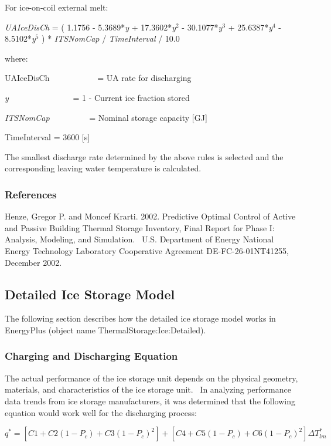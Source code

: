For ice-on-coil external melt:

\emph{UAIceDisCh} = ( 1.1756 - 5.3689*\emph{y} + 17.3602*\emph{y}\(^{2}\) - 30.1077*\emph{y}\(^{3}\) + 25.6387*\emph{y}\(^{4}\) - 8.5102*\emph{y}\(^{5}\) ) * \emph{ITSNomCap} / \emph{TimeInterval} / 10.0

where:

UAIceDisCh~~~~~~~~~~~ = UA rate for discharging

\emph{y}~~~~~~~~~~~~~~~ = 1 - Current ice fraction stored

\emph{ITSNomCap}~~~~~~~~~ = Nominal storage capacity {[}GJ{]}

TimeInterval = 3600 {[}s{]}

The smallest discharge rate determined by the above rules is selected and the corresponding leaving water temperature is calculated.

\subsubsection{References}\label{references-028}

Henze, Gregor P. and Moncef Krarti. 2002. Predictive Optimal Control of Active and Passive Building Thermal Storage Inventory, Final Report for Phase I:~ Analysis, Modeling, and Simulation.~ U.S. Department of Energy National Energy Technology Laboratory Cooperative Agreement DE-FC-26-01NT41255, December 2002.

\subsection{Detailed Ice Storage Model}\label{detailed-ice-storage-model}

The following section describes how the detailed ice storage model works in EnergyPlus (object name ThermalStorage:Ice:Detailed).

\subsubsection{Charging and Discharging Equation}\label{charging-and-discharging-equation}

The actual performance of the ice storage unit depends on the physical geometry, materials, and characteristics of the ice storage unit.~ In analyzing performance data trends from ice storage manufacturers, it was determined that the following equation would work well for the discharging process:

\begin{equation}
{q^*} = \left[ {C1 + C2\left( {1 - {P_c}} \right) + C3{{\left( {1 - {P_c}} \right)}^2}} \right] + \left[ {C4 + C5\left( {1 - {P_c}} \right) + C6{{\left( {1 - {P_c}} \right)}^2}} \right]\Delta T_{lm}^*
\end{equation}

